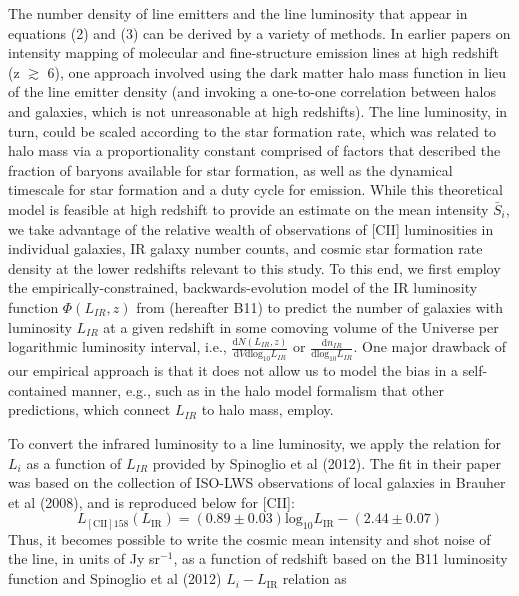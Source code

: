 \documentclass[12pt,preprint]{emulateapj}
\begin{document}
The number density of line emitters and the line luminosity that appear in equations (2) and (3) can be derived by a variety of methods. In earlier papers on intensity mapping of molecular and fine-structure emission lines at high redshift (z $\gtrsim$ 6), one approach involved using the dark matter halo mass function in lieu of the line emitter density (and invoking a one-to-one correlation between halos and galaxies, which is not unreasonable at high redshifts). The line luminosity, in turn, could be scaled according to the star formation rate, which was related to halo mass via a proportionality constant comprised of factors that described the fraction of baryons available for star formation, as well as the dynamical timescale for star formation and a duty cycle for emission. While this theoretical model is feasible at high redshift to provide an estimate on the mean intensity $\bar{S}_i$, we take advantage of the relative wealth of observations of [CII] luminosities in individual galaxies, IR galaxy 
number counts, and cosmic star formation rate density at the lower redshifts relevant to this study. To this end, we first employ the empirically-constrained, backwards-evolution model of the IR luminosity function $\Phi(L_{IR}, z)$ from \citet{bethermin11} (hereafter B11) to predict the number of galaxies with luminosity $L_{IR}$ at a given redshift in some comoving volume of the Universe per logarithmic luminosity interval, i.e., $\frac{\mathrm{d}N(L_{IR},z)}{\mathrm{d}V\mathrm{dlog_{10}}L_{IR}}$ or $\frac{\mathrm{d}n_{IR}}{\mathrm{dlog_{10}}L_{IR}}$.  One major drawback of our empirical approach is that it does not allow us to model the bias in a self-contained manner, e.g., such as in the halo model formalism that other predictions, which connect $L_{IR}$ to halo mass, employ. 

To convert the infrared luminosity to a line luminosity, we apply the relation for $L_{i}$ as a function of $L_{IR}$ provided by Spinoglio et al (2012). The fit in their paper was based on the collection of ISO-LWS observations of local galaxies in Brauher et al (2008), and is reproduced below for [CII]: 
\begin{equation}
L_{\mathrm{[CII]158}}(L_{\mathrm{IR}}) = (0.89 \pm 0.03) \mathrm{log_{10}}L_{\mathrm{IR}} - (2.44 \pm 0.07)
\end{equation}
Thus, it becomes possible to write the cosmic mean intensity and shot noise of the line, in units of Jy sr$^{-1}$,  as a function of redshift based on the B11 luminosity function and Spinoglio et al (2012) $L_{i}-L_{\mathrm{IR}}$ relation as
\end{document}
